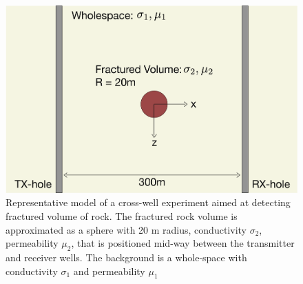 \begin{figure}
    \begin{center}
    \includegraphics[width=\columnwidth]{figures/phys_prop_model/sphere_frac.png}
    \end{center}
\caption{
    Representative model of a cross-well experiment aimed at detecting
    fractured volume of rock. The fractured rock volume is approximated as a sphere
    with 20 m radius, conductivity $\sigma_2$, permeability $\mu_2$, that is
    positioned mid-way between the transmitter and receiver wells. The background
    is a whole-space with conductivity $\sigma_1$ and permeability $\mu_1$
}
\label{fig:sphere_frac}
\end{figure}
